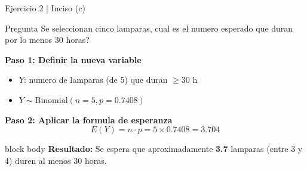 \documentclass[10pt]{beamer}
\begin{document}
\begin{frame}{Ejercicio 2 | Inciso (c)}
\begin{exampleblock}{Pregunta}
Se seleccionan cinco lamparas, cual es el numero esperado que duran por lo menos 30 horas?
\end{exampleblock}

\vspace{0.2cm}
\textbf{Paso 1: Definir la nueva variable}
\begin{itemize}
    \item $Y$: numero de lamparas (de 5) que duran $\geq 30$ h
    \item $Y \sim \text{Binomial}(n=5, p=0.7408)$
\end{itemize}

\vspace{0.1cm}
\textbf{Paso 2: Aplicar la formula de esperanza}
\[
E(Y) = n \cdot p = 5 \times 0.7408 = \boxed{3.704}
\]

\vspace{0.2cm}
\begin{beamercolorbox}[rounded=true,shadow=true,wd=\linewidth]{block body}
\centering
\textbf{Resultado:} Se espera que aproximadamente \textbf{3.7} lamparas (entre 3 y 4) duren al menos 30 horas.
\end{beamercolorbox}
\end{frame}
\end{document}
